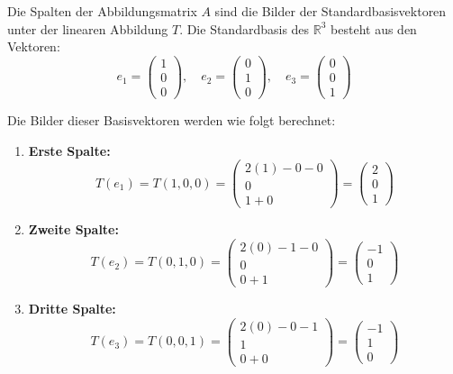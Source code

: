 Die Spalten der Abbildungsmatrix \(A\) sind die Bilder der Standardbasisvektoren unter der linearen Abbildung \(T\). Die Standardbasis des \(\mathbb{R}^3\) besteht aus den Vektoren:
\[
e_1 = \begin{pmatrix} 1 \\ 0 \\ 0 \end{pmatrix}, \quad
e_2 = \begin{pmatrix} 0 \\ 1 \\ 0 \end{pmatrix}, \quad
e_3 = \begin{pmatrix} 0 \\ 0 \\ 1 \end{pmatrix}
\]

Die Bilder dieser Basisvektoren werden wie folgt berechnet:
\begin{enumerate}
    \item \textbf{Erste Spalte:}
    \[
        T(e_1) = T(1,0,0) = \begin{pmatrix} 2(1) - 0 - 0 \\ 0 \\ 1 + 0 \end{pmatrix} = \begin{pmatrix} 2 \\ 0 \\ 1 \end{pmatrix}
    \]
    
    \item \textbf{Zweite Spalte:}
    \[
        T(e_2) = T(0,1,0) = \begin{pmatrix} 2(0) - 1 - 0 \\ 0 \\ 0 + 1 \end{pmatrix} = \begin{pmatrix} -1 \\ 0 \\ 1 \end{pmatrix}
    \]
    
    \item \textbf{Dritte Spalte:}
    \[
        T(e_3) = T(0,0,1) = \begin{pmatrix} 2(0) - 0 - 1 \\ 1 \\ 0 + 0 \end{pmatrix} = \begin{pmatrix} -1 \\ 1 \\ 0 \end{pmatrix}
    \]
\end{enumerate}

